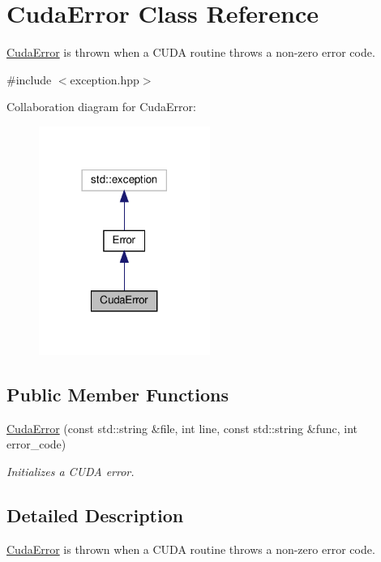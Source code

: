 \hypertarget{classCudaError}{}\section{Cuda\+Error Class Reference}
\label{classCudaError}


\hyperlink{classCudaError}{Cuda\+Error} is thrown when a C\+U\+DA routine throws a non-\/zero error code.  




{\ttfamily \#include $<$exception.\+hpp$>$}



Collaboration diagram for Cuda\+Error\+:
\nopagebreak
\begin{figure}[H]
\begin{center}
\leavevmode
\includegraphics[width=158pt]{classCudaError__coll__graph}
\end{center}
\end{figure}
\subsection*{Public Member Functions}
\begin{DoxyCompactItemize}
\item 
\hyperlink{classCudaError_a90e176d63d838031cb364cdb54532aaf}{Cuda\+Error} (const std\+::string \&file, int line, const std\+::string \&func, int error\+\_\+code)
\begin{DoxyCompactList}\small\item\em Initializes a C\+U\+DA error. \end{DoxyCompactList}\end{DoxyCompactItemize}


\subsection{Detailed Description}
\hyperlink{classCudaError}{Cuda\+Error} is thrown when a C\+U\+DA routine throws a non-\/zero error code. 

